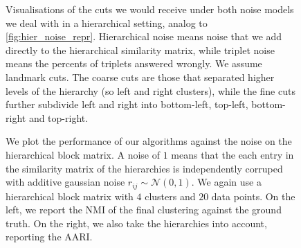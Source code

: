 \onecolumn
\begin{figure}[ht]
    \centering
    \hfill
    \caption{
        Visualisations of the cuts we would receive under both noise models we deal with in a hierarchical setting, analog to \autoref{fig:hier_noise_repr}.
        Hierarchical noise means noise that we add directly to the hierarchical similarity matrix, while triplet noise means the 
        percents of triplets answered wrongly. We assume landmark cuts. The coarse cuts are those that separated higher levels of the hierarchy (so left and right clusters), while
        the fine cuts further subdivide left and right into bottom-left, top-left, bottom-right and top-right.
    }
    \label{fig:hier_noise_cuts}
\end{figure}

\onecolumn
\begin{figure}[ht]
    \centering
    \caption{
        We plot the performance of our algorithms against the noise on the hierarchical block matrix. A noise of $1$ means that the each 
        entry in the similarity matrix of the hierarchies is independently corruped with additive gaussian noise $r_{ij} \sim \mathcal{N}(0, 1)$.
        We again use a hierarchical block matrix with $4$ clusters and $20$ data points. On the left, we report the NMI of the final clustering against the ground
        truth. On the right, we also take the hierarchies into account, reporting the AARI.
    }
    \label{fig:hierarchy-add-hierarchy-noise}
\end{figure}


